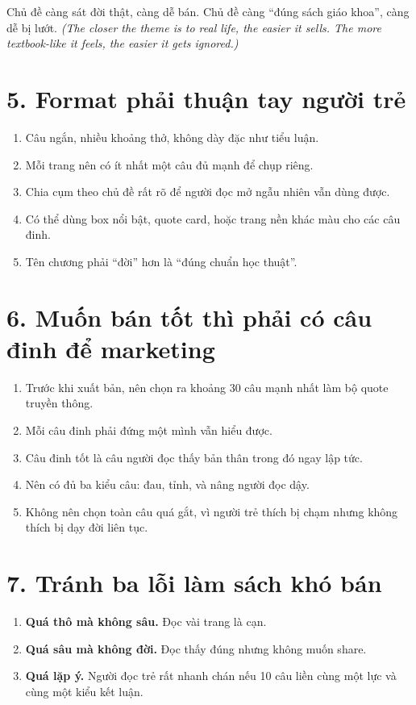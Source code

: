 \begin{baihoc}
Chủ đề càng sát đời thật, càng dễ bán. Chủ đề càng ``đúng sách giáo khoa'', càng dễ bị lướt.
\textit{(The closer the theme is to real life, the easier it sells. The more textbook-like it feels, the easier it gets ignored.)}
\end{baihoc}

\section{5. Format phải thuận tay người trẻ}
\begin{enumerate}[leftmargin=*]
\item Câu ngắn, nhiều khoảng thở, không dày đặc như tiểu luận.
\item Mỗi trang nên có ít nhất một câu đủ mạnh để chụp riêng.
\item Chia cụm theo chủ đề rất rõ để người đọc mở ngẫu nhiên vẫn dùng được.
\item Có thể dùng box nổi bật, quote card, hoặc trang nền khác màu cho các câu đinh.
\item Tên chương phải ``đời'' hơn là ``đúng chuẩn học thuật''.
\end{enumerate}

\section{6. Muốn bán tốt thì phải có câu đinh để marketing}
\begin{enumerate}[leftmargin=*]
\item Trước khi xuất bản, nên chọn ra khoảng 30 câu mạnh nhất làm bộ quote truyền thông.
\item Mỗi câu đinh phải đứng một mình vẫn hiểu được.
\item Câu đinh tốt là câu người đọc thấy bản thân trong đó ngay lập tức.
\item Nên có đủ ba kiểu câu: đau, tỉnh, và nâng người đọc dậy.
\item Không nên chọn toàn câu quá gắt, vì người trẻ thích bị chạm nhưng không thích bị dạy đời liên tục.
\end{enumerate}

\section{7. Tránh ba lỗi làm sách khó bán}
\begin{enumerate}[leftmargin=*]
\item \textbf{Quá thô mà không sâu.} Đọc vài trang là cạn.
\item \textbf{Quá sâu mà không đời.} Đọc thấy đúng nhưng không muốn share.
\item \textbf{Quá lặp ý.} Người đọc trẻ rất nhanh chán nếu 10 câu liền cùng một lực và cùng một kiểu kết luận.
\end{enumerate}

